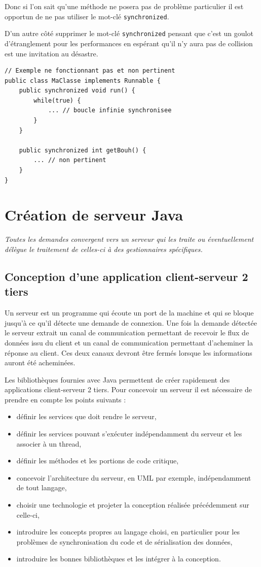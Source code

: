 \documentclass[a4paper,11pt]{report}
\begin{document}
Donc si l\rq{}on sait qu\rq{}une méthode ne posera pas de problème particulier il est opportun de ne pas utiliser le mot-clé \texttt{synchronized}.

D\rq{}un autre côté supprimer le mot-clé \texttt{synchronized} pensant que c\rq{}est un goulot d\rq{}étranglement pour les performances en espérant qu\rq{}il n\rq{}y aura pas  de collision est une invitation au désastre.

\begin{lstlisting}
// Exemple ne fonctionnant pas et non pertinent
public class MaClasse implements Runnable {
	public synchronized void run() {
		while(true) {
			... // boucle infinie synchronisee
		}
	}
	
	public synchronized int getBouh() {
		... // non pertinent
	}
}
\end{lstlisting}


\chapter{Création de serveur Java}

\textit{Toutes les demandes convergent vers un serveur qui les traite ou éventuellement délègue le traitement de celles-ci à des gestionnaires spécifiques.}

\section{Conception d\rq{}une application client-serveur 2 tiers}

Un serveur est un programme qui écoute un port de la machine et qui se bloque jusqu\rq{}à ce qu\rq{}il détecte une demande de connexion. Une fois la demande détectée le serveur extrait un canal de communication permettant de recevoir le flux de données issu du client et un canal de communication permettant d\rq{}acheminer la réponse au client. Ces deux canaux devront être fermés lorsque les informations auront été acheminées.

Les bibliothèques fournies avec Java permettent de créer rapidement des applications client-serveur 2 tiers. Pour concevoir un serveur il est nécessaire de prendre en compte les points suivants :
\begin{itemize}
\item définir les services que doit rendre le serveur,
\item définir les services pouvant s\rq{}exécuter indépendamment du serveur et les associer à un thread,
\item définir les méthodes et les portions de code critique,
\item concevoir l\rq{}architecture du serveur, en UML par exemple, indépendamment de tout langage,
\item choisir une technologie et projeter la conception réalisée précédemment sur celle-ci,
\item introduire les concepts propres au langage choisi, en particulier pour les problèmes de synchronisation du code et de sérialisation des données,
\item introduire les bonnes bibliothèques et les intégrer à la conception.
\end{itemize}
\end{document}
